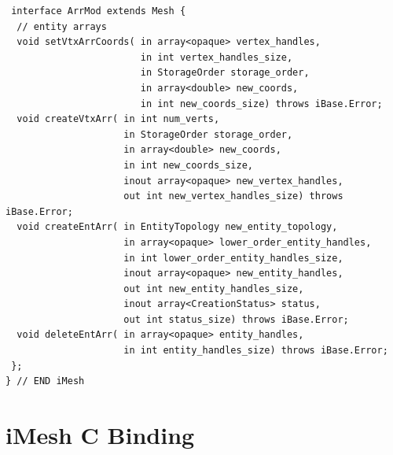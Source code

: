 \documentclass{article}
\begin{document}
\begin{small}
\begin{verbatim}
 interface ArrMod extends Mesh { 
  // entity arrays 
  void setVtxArrCoords( in array<opaque> vertex_handles, 
                        in int vertex_handles_size, 
                        in StorageOrder storage_order,  
                        in array<double> new_coords,  
                        in int new_coords_size) throws iBase.Error; 
  void createVtxArr( in int num_verts, 
                     in StorageOrder storage_order, 
                     in array<double> new_coords, 
                     in int new_coords_size, 
                     inout array<opaque> new_vertex_handles,  
                     out int new_vertex_handles_size) throws iBase.Error; 
  void createEntArr( in EntityTopology new_entity_topology, 
                     in array<opaque> lower_order_entity_handles,  
                     in int lower_order_entity_handles_size, 
                     inout array<opaque> new_entity_handles, 
                     out int new_entity_handles_size, 
                     inout array<CreationStatus> status, 
                     out int status_size) throws iBase.Error;  
  void deleteEntArr( in array<opaque> entity_handles, 
                     in int entity_handles_size) throws iBase.Error; 
 };
} // END iMesh
\end{verbatim}
\end{small}

\newpage
\section{iMesh C Binding}
\end{document}
